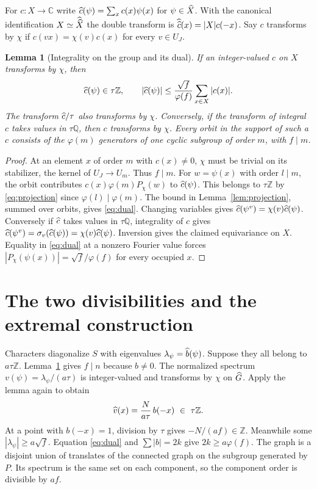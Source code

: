 \documentclass[11pt]{article}
\newtheorem{lemma}[theorem]{Lemma}
\newcommand{\Z}{\mathbb Z}\newcommand{\Q}{\mathbb Q}\newcommand{\C}{\mathbb C}
\begin{document}
For $c:X\to\C$ write $\widehat c(\psi)=\sum_xc(x)\psi(x)$ for $\psi\in\widehat X$. With the canonical identification $X\simeq\widehat{\widehat X}$ the double transform is $\widehat{\widehat c}(x)=|X|c(-x)$. Say $c$ transforms by $\chi$ if $c(vx)=\chi(v)c(x)$ for every $v\in U_J$.

\begin{lemma}[Integrality on the group and its dual]\label{lem:dual}
If an integer-valued $c$ on $X$ transforms by $\chi$, then
\begin{equation}
 \wh c(\psi)\in\tau\Z,\qquad
 |\wh c(\psi)|\le \frac{\sqrt f}{\varphi(f)}\sum_{x\in X}|c(x)|.
 \label{eq:dual}
\end{equation}
The transform $\widehat c/\tau$ also transforms by $\chi$. Conversely, if the transform of integral $c$ takes values in $\tau\Q$, then $c$ transforms by $\chi$. Every orbit in the support of such a $c$ consists of the $\varphi(m)$ generators of one cyclic subgroup of order $m$, with $f\mid m$.
\end{lemma}
\begin{proof}
At an element $x$ of order $m$ with $c(x)\ne0$, $\chi$ must be trivial on its stabilizer, the kernel of $U_J\to U_m$. Thus $f\mid m$. For $w=\psi(x)$ with order $l\mid m$, the orbit contributes $c(x)\varphi(m)P_\chi(w)$ to $\widehat c(\psi)$. This belongs to $\tau\Z$ by \eqref{eq:projection} since $\varphi(l)\mid\varphi(m)$. The bound in Lemma~\ref{lem:projection}, summed over orbits, gives \eqref{eq:dual}. Changing variables gives $\widehat c(\psi^v)=\chi(v)\widehat c(\psi)$. Conversely if $\widehat c$ takes values in $\tau\Q$, integrality of $c$ gives $\widehat c(\psi^v)=\sigma_v(\widehat c(\psi))=\chi(v)\widehat c(\psi)$. Inversion gives the claimed equivariance on $X$. Equality in \eqref{eq:dual} at a nonzero Fourier value forces $|P_\chi(\psi(x))|=\sqrt f/\varphi(f)$ for every occupied $x$.
\end{proof}

\section{The two divisibilities and the extremal construction}
Characters diagonalize $S$ with eigenvalues $\lambda_\psi=\widehat b(\psi)$. Suppose they all belong to $a\tau\Z$. Lemma~\ref{lem:dual} gives $f\mid n$ because $b\ne0$. The normalized spectrum $v(\psi)=\lambda_\psi/(a\tau)$ is integer-valued and transforms by $\chi$ on $\widehat G$. Apply the lemma again to obtain
\begin{equation}
             \wh v(x)=\frac{N}{a\tau}\,b(-x)\ \in\ \tau\Z .
             \label{eq:bidual}
\end{equation}
At a point with $b(-x)=1$, division by $\tau$ gives $-N/(af)\in\Z$. Meanwhile some $|\lambda_\psi|\ge a\sqrt f$. Equation \eqref{eq:dual} and $\sum|b|=2k$ give $2k\ge a\varphi(f)$. The graph is a disjoint union of translates of the connected graph on the subgroup generated by $P$. Its spectrum is the same set on each component, so the component order is divisible by $af$.
\end{document}
